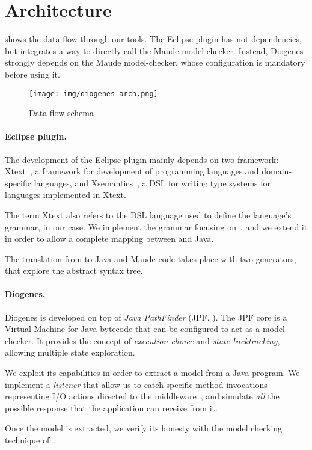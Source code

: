 \section{Architecture}

 shows the data-flow through our tools.
The Eclipse plugin has not dependencies,
but integrates a way to directly call the Maude model-checker.
%
Instead, Diogenes strongly depends on
the Maude model-checker, whose configuration is mandatory before using it.


\begin{figure}[t]
    \texttt{[image: img/diogenes-arch.png]}
    \caption{Data flow schema}
    \label{fig:data-flow}
\end{figure}

\paragraph{Eclipse plugin.}
The development of the Eclipse plugin mainly depends on
two framework: Xtext~\cite{xtext-site}, a framework for 
development of programming languages and domain-specific languages, and
Xsemantics~\cite{xsemantics-site}, a DSL for writing type systems
for languages implemented in Xtext.

The term Xtext also refers to the DSL language
used to define the language's grammar, \coco in our case.
We implement the grammar focusing on~\cite{verifiable},
and we extend it
in order to allow a complete mapping between \coco and Java.

The translation from \coco to Java and Maude code
takes place with two generators, that explore the abstract syntax tree. 

\paragraph{Diogenes.}
Diogenes is developed on top of \emph{Java PathFinder}
(JPF, \cite{lerda2001addressing,visser2003model}).
The JPF core is a Virtual Machine for Java bytecode
that can be configured to act as a model-checker.
It provides the concept of \emph{execution choice}
and \emph{state backtracking}, allowing multiple state exploration.

We exploit its capabilities in order to extract a \coco model
from a Java program. We implement a \emph{listener} that allow us
to catch specific method invocations representing I/O actions
directed to the middleware~\cite{CO2middleware},
and simulate \emph{all} the possible response that 
the application can receive from it.

Once the \coco model is extracted, we verify its honesty
with the model checking technique of~\cite{verifiable}.

